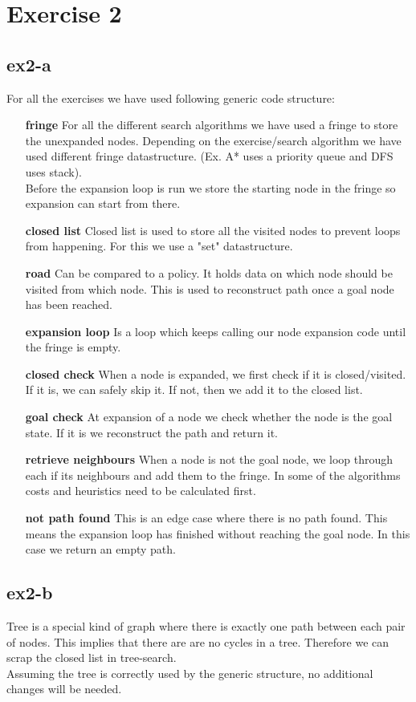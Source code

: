 \section{Exercise 2}
\subsection{ex2-a}

For all the exercises we have used following generic code structure:
\begin{itemize}
\item [\textbf{fringe}] For all the different search algorithms we have used a fringe to store the unexpanded nodes. Depending on the exercise/search algorithm we have used different fringe datastructure. (Ex. A* uses a priority queue and DFS uses stack).\\
Before the expansion loop is run we store the starting node in the fringe so expansion can start from there. 
\item [\textbf{closed list}] Closed list is used to store all the visited nodes to prevent loops from happening. For this we use a "set" datastructure.
\item [\textbf{road}] Can be compared to a policy. It holds data on which node should be visited from which node. This is used to reconstruct path once a goal node has been reached.
\item [\textbf{expansion loop}] Is a loop which keeps calling our node expansion code until the fringe is empty.
\item [\textbf{closed check}] When a node is expanded, we first check if it is closed/visited. If it is, we can safely skip it. If not, then we add it to the closed list.
\item [\textbf{goal check}] At expansion of a node we check whether the node is the goal state. If it is we reconstruct the path and return it.
\item [\textbf{retrieve neighbours}] When a node is not the goal node, we loop through each if its neighbours and add them to the fringe. In some of the algorithms costs and heuristics need to be calculated first.
\item [\textbf{not path found}] This is an edge case where there is no path found. This means the expansion loop has finished without reaching the goal node. In this case we return an empty path.
\end{itemize}

\subsection{ex2-b}
Tree is a special kind of graph where there is exactly one path between each pair of nodes. This implies that there are are no cycles in a tree. Therefore we can scrap the closed list in tree-search. \\
Assuming the tree is correctly used by the generic structure, no additional changes will be needed.